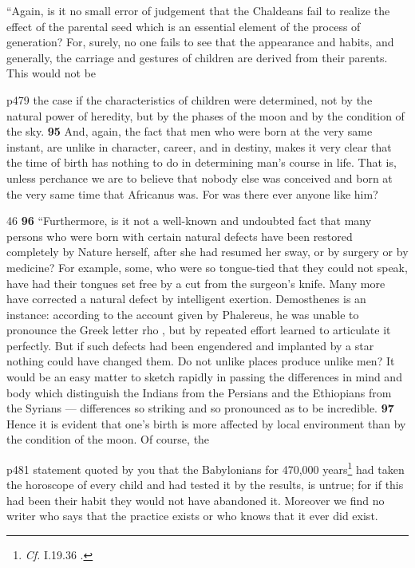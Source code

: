 ``Again, is it no small error of judgement that the Chaldeans fail to realize the effect of the parental seed which is an essential element of the process of generation? For, surely, no one fails to see that the appearance and habits, and generally, the carriage and gestures of children are derived from their parents. This would not be

p479 the case if the characteristics of children were determined, not by the natural power of heredity, but by the phases of the moon and by the condition of the sky. \textbf{95} And, again, the fact that men who were born at the very same instant, are unlike in character, career, and in destiny, makes it very clear that the time of birth has nothing to do in determining man's course in life. That is, unless perchance we are to believe that nobody else was conceived and born at the very same time that Africanus was. For was there ever anyone like him?

46
\textbf{96} ``Furthermore, is it not a well-known and undoubted fact that many persons who were born with certain natural defects have been restored completely by Nature herself, after she had resumed her sway, or by surgery or by medicine? For example, some, who were so tongue-tied that they could not speak, have had their tongues set free by a cut from the surgeon's knife. Many more have corrected a natural defect by intelligent exertion. Demosthenes is an instance: according to the account given by Phalereus, he was unable to pronounce the Greek letter rho , but by repeated effort learned to articulate it perfectly. But if such defects had been engendered and implanted by a star nothing could have changed them. Do not unlike places produce unlike men? It would be an easy matter to sketch rapidly in passing the differences in mind and body which distinguish the Indians from the Persians and the Ethiopians from the Syrians \texthebrew{—} differences so striking and so pronounced as to be incredible. \textbf{97} Hence it is evident that one's birth is more affected by local environment than by the condition of the moon. Of course, the

p481 statement quoted by you that the Babylonians for 470,000 years\texthebrew{}\footnote{\emph{Cf.}
I.19.36 .

} had taken the horoscope of every child and had tested it by the results, is untrue; for if this had been their habit they would not have abandoned it. Moreover we find no writer who says that the practice exists or who knows that it ever did exist.

